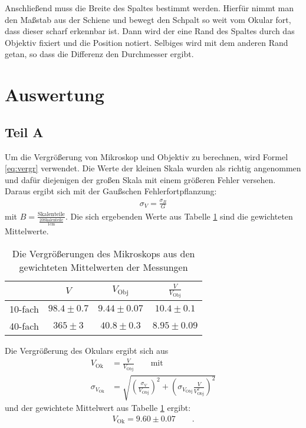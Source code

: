 \documentclass[12pt,a4paper,titlepage,headinclude,bibtotoc]{scrartcl}
\begin{document}
Anschließend muss die Breite des Spaltes bestimmt werden.
Hierfür nimmt man den Maßstab aus der Schiene und bewegt den Schpalt so weit vom Okular fort, dass dieser scharf erkennbar ist.
Dann wird der eine Rand des Spaltes  durch das Objektiv fixiert und die Position notiert.
Selbiges wird mit dem anderen Rand getan, so dass die Differenz den Durchmesser ergibt.



\section{Auswertung}
\label{sec:auswertung}
\subsection{Teil A}
Um die Vergrößerung von Mikroskop und Objektiv zu berechnen, wird Formel \eqref{eq:vergr} verwendet.
Die Werte der kleinen Skala wurden als richtig angenommen und dafür diejenigen der großen Skala mit einem größeren Fehler versehen.
Daraus ergibt sich mit der Gaußschen Fehlerfortpflanzung:
\begin{align*}
\sigma_V=\frac{\sigma_B}{G}
\end{align*}
mit $B=\frac{\text{Skalenteile}}{\frac{20\text{Skalenteile}}{1\si{\centi\metre}}}$.
Die sich ergebenden Werte aus Tabelle \ref{tab:vergr} sind die gewichteten Mittelwerte.
\begin{table}[!h]
\centering
\begin{tabular}{|c||c|c|c|}
\hline
 & $V$ & $V_\text{Obj}$ & $\frac{V}{V_\text{Obj}}$\\\hline\hline
10-fach & $98.4\pm0.7$ & $9.44\pm0.07$ & $10.4\pm 0.1$ \\\hline
40-fach & $365\pm 3$ & $40.8\pm 0.3$ &$8.95\pm0.09$ \\\hline
\end{tabular}
\caption{Die Vergrößerungen des Mikroskops aus den gewichteten Mittelwerten der Messungen}
\label{tab:vergr}
\end{table}


Die Vergrößerung des Okulars ergibt sich aus
\begin{align}
V_\text{Ok}&=\frac{V}{V_\text{Obj}}\qquad \text{mit}\\
\sigma_{V_\text{Ok}}&=\sqrt{\left(\frac{\sigma_V}{V_\text{Obj}}\right)^2+\left(\sigma_{V_\text{Obj}} \frac{V}{V_\text{Obj}^2} \right)^2}
\end{align}
und der gewichtete Mittelwert aus Tabelle \ref{tab:vergr} ergibt:
\begin{align}
V_\text{Ok}=9.60\pm0.07\qquad .
\end{align}
\end{document}
